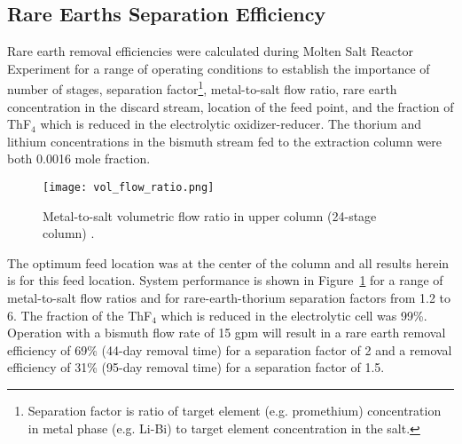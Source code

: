 \subsection{Rare Earths Separation Efficiency} \label{sec:rare_earth_eff}
Rare earth removal efficiencies were calculated during Molten Salt Reactor Experiment for a range of operating conditions to establish the importance of number of stages, separation factor\footnote{Separation factor is ratio of target element (e.g. promethium) concentration in metal phase (e.g. Li-Bi) to target element concentration in the salt.}, metal-to-salt flow ratio, rare earth concentration in the discard stream, location of the feed point, and the fraction of ThF$_4$ which is reduced in the electrolytic oxidizer-reducer. The thorium and lithium concentrations in the bismuth stream fed to the extraction column were both 0.0016 mole fraction. 
\begin{figure}[htbp!]
    \begin{center}
        \texttt{[image: vol\_flow\_ratio.png]}
    \end{center}
    \caption{Metal-to-salt volumetric flow ratio in upper column (24-stage column) \cite{briggs_molten-salt_1969}.}
    \label{fig:vol-flow-ratio}
\end{figure}

The optimum feed location was at the center of the column and all results herein is for this feed
location. System performance is shown in Figure~\ref{fig:vol-flow-ratio} for a range of metal-to-salt flow ratios and for rare-earth-thorium separation factors from 1.2 to 6. The fraction of the ThF$_4$ which is reduced in the electrolytic cell was 99\%. Operation with a bismuth flow rate of 15 gpm will result in a rare earth removal efficiency of 69\% (44-day removal time) for a separation factor of 2 and a removal efficiency of 31\% (95-day removal time) for a separation factor of 1.5.

